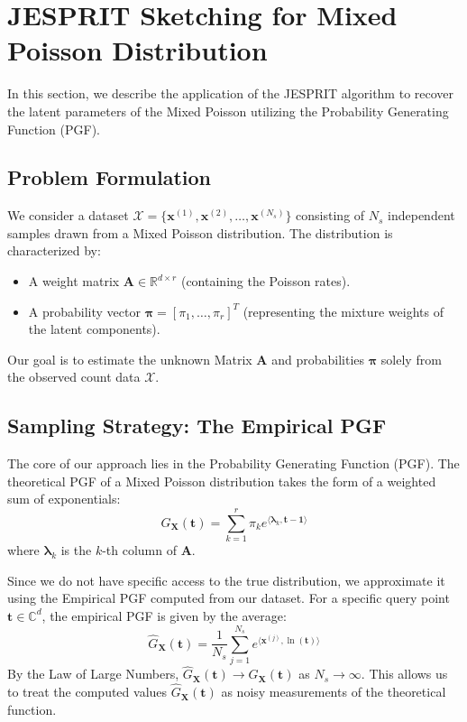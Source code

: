 \section{JESPRIT Sketching for Mixed Poisson Distribution}

In this section, we describe the application of the JESPRIT algorithm to recover the latent parameters of the Mixed Poisson utilizing the Probability Generating Function (PGF).

\subsection{Problem Formulation}

We consider a dataset $\mathcal{X} = \{\mathbf{x}^{(1)}, \mathbf{x}^{(2)}, \dots, \mathbf{x}^{(N_s)}\}$ consisting of $N_s$ independent samples drawn from a Mixed Poisson distribution.
The distribution is characterized by:
\begin{itemize}
    \item A weight matrix $\mathbf{A} \in \mathbb{R}^{d \times r}$ (containing the Poisson rates).
    \item A probability vector $\boldsymbol{\pi} = [\pi_1, \dots, \pi_r]^T$ (representing the mixture weights of the latent components).
\end{itemize}

Our goal is to estimate the unknown Matrix $\mathbf{A}$ and probabilities $\boldsymbol{\pi}$ solely from the observed count data $\mathcal{X}$.

\subsection{Sampling Strategy: The Empirical PGF}

The core of our approach lies in the Probability Generating Function (PGF). The theoretical PGF of a Mixed Poisson distribution takes the form of a weighted sum of exponentials:
\begin{equation}
    G_{\mathbf{X}}(\mathbf{t}) = \sum_{k=1}^{r} \pi_k e^{\langle \boldsymbol{\lambda}_k, \mathbf{t} - \mathbf{1} \rangle}
    \label{eq:theoretical_pgf}
\end{equation}
where $\boldsymbol{\lambda}_k$ is the $k$-th column of $\mathbf{A}$.

Since we do not have specific access to the true distribution, we approximate it using the Empirical PGF computed from our dataset. For a specific query point $\mathbf{t} \in \mathbb{C}^d$, the empirical PGF is given by the average:
\begin{equation}
    \hat{G}_{\mathbf{X}}(\mathbf{t}) = \frac{1}{N_s} \sum_{j=1}^{N_s} e^{\langle \mathbf{x}^{(j)}, \ln(\mathbf{t}) \rangle}
    \label{eq:empirical_pgf}
\end{equation}
By the Law of Large Numbers, $\hat{G}_{\mathbf{X}}(\mathbf{t}) \to G_{\mathbf{X}}(\mathbf{t})$ as $N_s \to \infty$. This allows us to treat the computed values $\hat{G}_{\mathbf{X}}(\mathbf{t})$ as noisy measurements of the theoretical function.

